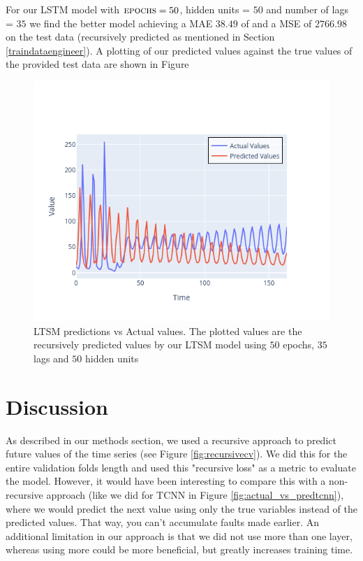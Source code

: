 \documentclass[conference]{IEEEtran}
\begin{document}
For our LSTM model with $\textsc{epochs} = 50$, hidden units = $50$ and number of lags = $35$ we 
find the better model achieving a MAE $38.49$ of and a MSE of $2766.98$ on the test data 
(recursively predicted as mentioned in Section \ref{traindataengineer}). A plotting of our 
predicted values against the true values of the provided test data are shown in Figure

\begin{figure}
    \includegraphics[scale=0.5]{pictures/newmodelresultlag35hu50.png}
    \caption{LTSM predictions vs Actual values. The plotted values are the recursively predicted 
    values by our LTSM model using $50$ epochs, $35$ lags and $50$ hidden units}
    \label{fig:modelresults}
\end{figure}

\section{Discussion}
As described in our methods section, we used a recursive approach to predict future values of the 
time series (see Figure \ref{fig:recursivecv}). We did this for the entire validation folds length 
and used this "recursive loss" as a metric to evaluate the model. However, it would have been 
interesting to compare this with a non-recursive approach (like we did for TCNN in Figure 
\ref{fig:actual_vs_predtcnn}), where we would predict the next value using only the true variables 
instead of the predicted values. That way, you can't accumulate faults made earlier.  
An additional limitation in our approach is that we did not use more than one layer, whereas using 
more could be more beneficial, but greatly increases training time.
\end{document}
